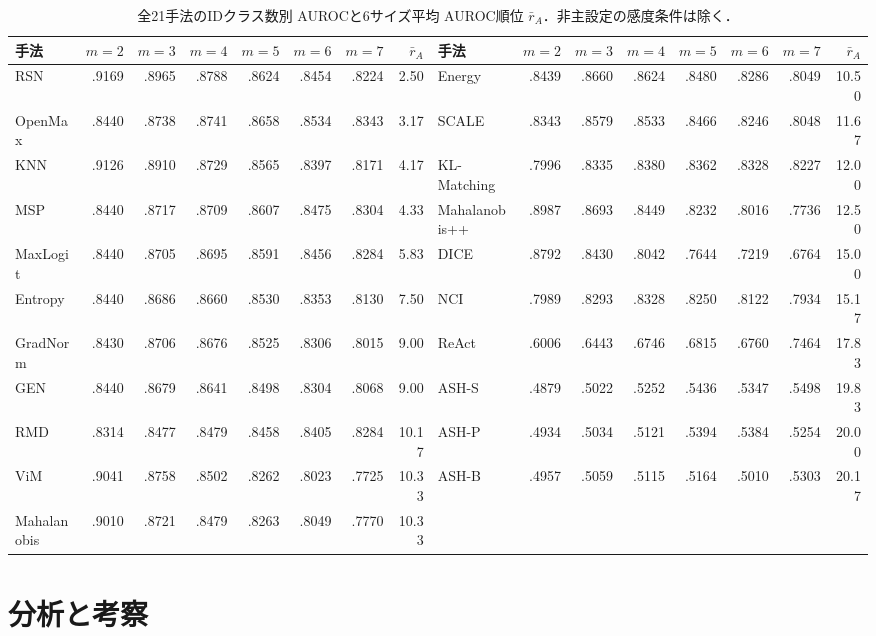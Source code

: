 \documentclass[uplatex,dvipdfmx,a4paper,10pt,twocolumn]{bxjsarticle}
\newcommand{\RSN}{RSN}
\newcommand{\knn}{KNN}
\begin{document}
\begin{table}[!t]
\centering
\tiny
\setlength{\tabcolsep}{1.35pt}
\caption{全21手法のIDクラス数別 AUROCと6サイズ平均 AUROC順位 $\bar r_A$．非主設定の感度条件は除く．}
\label{tab:fullranking}
\begin{tabular}{lrrrrrrr@{\hspace{3mm}}lrrrrrrr}
\toprule
手法 & $m{=}2$ & $m{=}3$ & $m{=}4$ & $m{=}5$ & $m{=}6$ & $m{=}7$ & $\bar r_A$ &
手法 & $m{=}2$ & $m{=}3$ & $m{=}4$ & $m{=}5$ & $m{=}6$ & $m{=}7$ & $\bar r_A$\\
\midrule
\RSN & .9169 & .8965 & .8788 & .8624 & .8454 & .8224 & 2.50 & Energy & .8439 & .8660 & .8624 & .8480 & .8286 & .8049 & 10.50\\
OpenMax & .8440 & .8738 & .8741 & .8658 & .8534 & .8343 & 3.17 & SCALE & .8343 & .8579 & .8533 & .8466 & .8246 & .8048 & 11.67\\
\knn & .9126 & .8910 & .8729 & .8565 & .8397 & .8171 & 4.17 & KL-Matching & .7996 & .8335 & .8380 & .8362 & .8328 & .8227 & 12.00\\
MSP & .8440 & .8717 & .8709 & .8607 & .8475 & .8304 & 4.33 & Mahalanobis++ & .8987 & .8693 & .8449 & .8232 & .8016 & .7736 & 12.50\\
MaxLogit & .8440 & .8705 & .8695 & .8591 & .8456 & .8284 & 5.83 & DICE & .8792 & .8430 & .8042 & .7644 & .7219 & .6764 & 15.00\\
Entropy & .8440 & .8686 & .8660 & .8530 & .8353 & .8130 & 7.50 & NCI & .7989 & .8293 & .8328 & .8250 & .8122 & .7934 & 15.17\\
GradNorm & .8430 & .8706 & .8676 & .8525 & .8306 & .8015 & 9.00 & ReAct & .6006 & .6443 & .6746 & .6815 & .6760 & .7464 & 17.83\\
GEN & .8440 & .8679 & .8641 & .8498 & .8304 & .8068 & 9.00 & ASH-S & .4879 & .5022 & .5252 & .5436 & .5347 & .5498 & 19.83\\
RMD & .8314 & .8477 & .8479 & .8458 & .8405 & .8284 & 10.17 & ASH-P & .4934 & .5034 & .5121 & .5394 & .5384 & .5254 & 20.00\\
ViM & .9041 & .8758 & .8502 & .8262 & .8023 & .7725 & 10.33 & ASH-B & .4957 & .5059 & .5115 & .5164 & .5010 & .5303 & 20.17\\
Mahalanobis & .9010 & .8721 & .8479 & .8263 & .8049 & .7770 & 10.33 & & & & & & & & \\
\bottomrule
\end{tabular}
\end{table}

\section{分析と考察}
\end{document}
